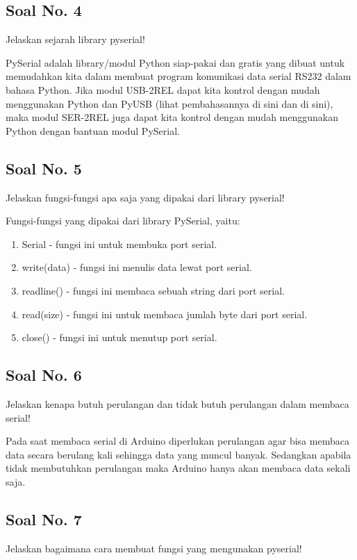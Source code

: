 \subsection{Soal No. 4}
Jelaskan sejarah library pyserial!

\hfill \break
PySerial adalah library/modul Python siap-pakai dan gratis yang dibuat untuk memudahkan kita dalam membuat program komunikasi data serial RS232 dalam bahasa Python.
Jika modul USB-2REL dapat kita kontrol dengan mudah menggunakan Python dan PyUSB (lihat pembahasannya di sini dan di sini), maka modul SER-2REL juga dapat kita kontrol dengan mudah menggunakan Python dengan bantuan modul PySerial.

\subsection{Soal No. 5}
Jelaskan fungsi-fungsi apa saja yang dipakai dari library pyserial!

\hfill \break
Fungsi-fungsi yang dipakai dari library PySerial, yaitu:
\begin{enumerate}
	\item Serial - fungsi ini untuk membuka port serial.
	\item write(data) - fungsi ini menulis data lewat port serial.
	\item readline() - fungsi ini membaca sebuah string dari port serial.
	\item read(size) - fungsi ini untuk membaca jumlah byte dari port serial.
	\item close() - fungsi ini untuk menutup port serial.
\end{enumerate}

\subsection{Soal No. 6}
Jelaskan kenapa butuh perulangan dan tidak butuh perulangan dalam membaca serial!

\hfill \break
Pada saat membaca serial di Arduino diperlukan perulangan agar bisa membaca data secara berulang kali sehingga data yang muncul banyak. Sedangkan apabila tidak membutuhkan perulangan maka Arduino hanya akan membaca data sekali saja.

\subsection{Soal No. 7}
Jelaskan bagaimana cara membuat fungsi yang mengunakan pyserial!

